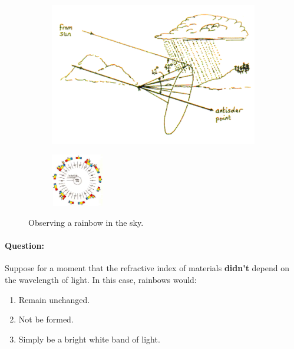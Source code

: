 \begin{figure}[!htb]
    \centering
    \begin{subfigure}[b]{0.5\linewidth}
    \centering
    \includegraphics[width=\textwidth]{figs/rainarc.png}
    \end{subfigure}%
    \begin{subfigure}[b]{0.5\linewidth}
    \centering
    \includegraphics[width=0.25\textwidth]{figs/multipleRainbowsLab.jpeg}
    \end{subfigure}
    \caption{Observing a rainbow in the sky.}
    \label{fig:rainbow}
\end{figure}

\begin{question}
\paragraph{Question:} Suppose for a moment that the refractive index of materials \textbf{didn't} depend on the wavelength of light. In this case, rainbows would:

\begin{enumerate}
\itemsep0em
    \item Remain unchanged.
    \item Not be formed.
    \item Simply be a bright white band of light.
\end{enumerate}
\end{question}

